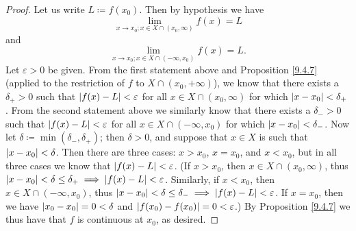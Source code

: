 \begin{proof}
    Let us write \(L \coloneqq f(x_0)\).
    Then by hypothesis we have
    \[
        \lim_{x \to x_0 ; x \in X \cap (x_0, \infty)} f(x) = L
    \]
    and
    \[
        \lim_{x \to x_0 ; x \in X \cap (-\infty, x_0)} f(x) = L.
    \]
    Let \(\varepsilon > 0\) be given.
    From the first statement above and Proposition \ref{9.4.7} (applied to the restriction of \(f\) to \(X \cap (x_0, +\infty)\)), we know that there exists a \(\delta_+ > 0\) such that \(\abs*{f(x) - L} < \varepsilon\) for all \(x \in X \cap(x_0, \infty)\) for which \(\abs*{x - x_0} < \delta_+\).
    From the second statement above we similarly know that there exists a \(\delta_- > 0\) such that \(\abs*{f(x) - L} < \varepsilon\) for all \(x \in X \cap (-\infty, x_0)\) for which \(\abs*{x - x_0} < \delta_-\).
    Now let \(\delta \coloneqq \min(\delta_-, \delta_+)\);
    then \(\delta > 0\), and suppose that \(x \in X\) is such that \(\abs*{x - x_0} < \delta\).
    Then there are three cases:
    \(x > x_0\), \(x = x_0\), and \(x < x_0\), but in all three cases we know that \(\abs*{f(x) - L} < \varepsilon\).
    (If \(x > x_0\), then \(x \in X \cap (x_0, \infty)\), thus \(\abs*{x - x_0} < \delta \leq \delta_+ \implies \abs*{f(x) - L} < \varepsilon\).
    Similarly, if \(x < x_0\), then \(x \in X \cap (-\infty, x_0)\), thus \(\abs*{x - x_0} < \delta \leq \delta_- \implies \abs*{f(x) - L} < \varepsilon\).
    If \(x = x_0\), then we have \(\abs*{x_0 - x_0} = 0 < \delta\) and \(\abs*{f(x_0) - f(x_0)} = 0 < \varepsilon\).)
    By Proposition \ref{9.4.7} we thus have that \(f\) is continuous at \(x_0\), as desired.
\end{proof}